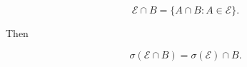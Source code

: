 $$\mathcal{E} \cap B = \{A \cap B : A \in \mathcal{E}\}.$$

Then

$$\sigma(\mathcal{E} \cap B) = \sigma(\mathcal{E}) \cap B.$$
